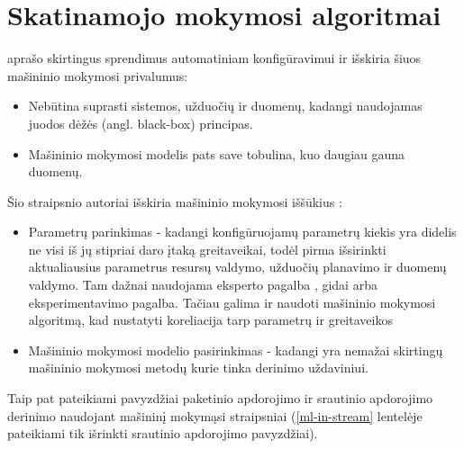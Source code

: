 \documentclass{VUMIFPSbakalaurinis}
\begin{document}
\section{Skatinamojo mokymosi algoritmai}
\cite{herodotou2020survey} aprašo skirtingus sprendimus automatiniam konfigūravimui ir išskiria šiuos mašininio mokymosi privalumus:
\begin{itemize}
    \item Nebūtina suprasti sistemos, užduočių ir duomenų, kadangi naudojamas juodos dėžės (angl. black-box) principas.
    \item Mašininio mokymosi modelis pats save tobulina, kuo daugiau gauna duomenų. 
\end{itemize}
Šio straipsnio autoriai išskiria mašininio mokymosi iššūkius : 
\begin{itemize}
    \item Parametrų parinkimas - kadangi konfigūruojamų parametrų kiekis yra didelis \cite{Bilal2017Towards, petridis2016spark} ne visi iš jų stipriai daro įtaką greitaveikai, todėl pirma išsirinkti aktualiausius parametrus resursų valdymo, užduočių planavimo ir duomenų valdymo. Tam dažnai naudojama eksperto pagalba \cite{wang2016novel}, gidai arba eksperimentavimo pagalba. Tačiau galima ir naudoti mašininio mokymosi algoritmą, kad nustatyti koreliacija tarp parametrų ir greitaveikos \cite{vaquero2018autotuning, yang2012statistics}
    \item Mašininio mokymosi modelio pasirinkimas - kadangi yra nemažai skirtingų mašininio mokymosi metodų kurie tinka derinimo uždaviniui.
\end{itemize} 
Taip pat pateikiami pavyzdžiai paketinio apdorojimo ir srautinio apdorojimo derinimo naudojant mašininį mokymąsi straipsniai (\ref{ml-in-stream} lentelėje pateikiami tik išrinkti srautinio apdorojimo pavyzdžiai).
\end{document}
